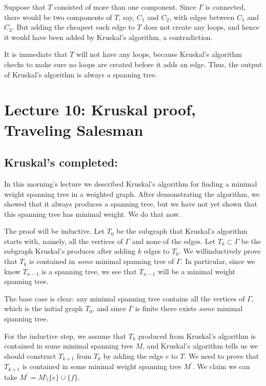 \documentclass[]{article}
\begin{document}
Suppose that \(T\) consisted of more than one component. Since
\(\Gamma\) is connected, there would be two components of \(T\), say,
\(C_1\) and \(C_2\), with edges between \(C_1\) and \(C_2\). But adding
the cheapest such edge to \(T\) does not create any loops, and hence it
would have been added by Kruskal's algorithm, a contradiction.

It is immediate that \(T\) will not have any loops, because Kruskal's
algorithm checks to make sure no loops are created before it adds an
edge. Thus, the output of Kruskal's algorithm is always a spanning tree.

\section{Lecture 10: Kruskal proof, Traveling Salesman}

\subsection{Kruskal's completed:}\label{kruskals-completed}

In this morning's lecture we described Kruskal's algorithm for finding a
minimal weight spanning tree in a weighted graph. After demonstrating
the algorithm, we showed that it always produces a spanning tree, but we
have not yet shown that this spanning tree has minimal weight. We do
that now.

The proof will be inductive. Let \(T_0\) be the subgraph that Kruskal's
algorithm starts with, namely, all the vertices of \(\Gamma\) and none
of the edges. Let \(T_k\subset\Gamma\) be the subgraph Kruskal's
produces after adding \(k\) edges to \(T_0\). We willinductively prove
that \(T_k\) is contained in \emph{some} minimal spanning tree of
\(\Gamma\). In particular, since we know \(T_{n-1}\) is a spanning tree,
we see that \(T_{n-1}\) will be a minimal weight spanning tree.

The base case is clear: any minimal spanning tree contains all the
vertices of \(\Gamma\), which is the initial graph \(T_0\), and since
\(\Gamma\) is finite there exists \emph{some} minimal spanning tree.

For the inductive step, we assume that \(T_k\) produced from Kruskal's
algorithm is contained in some minimal spanning tree \(M\), and
Kruskal's algorithm tells us we should construct \(T_{k+1}\) from
\(T_k\) by adding the edge \(e\) to \(T\). We need to prove that
\(T_{k+1}\) is contained in some minimal weight spanning tree
\(M^\prime\). We claim we can take
\(M^\prime=M\setminus\{e\}\cup\{f\}\).
\end{document}
